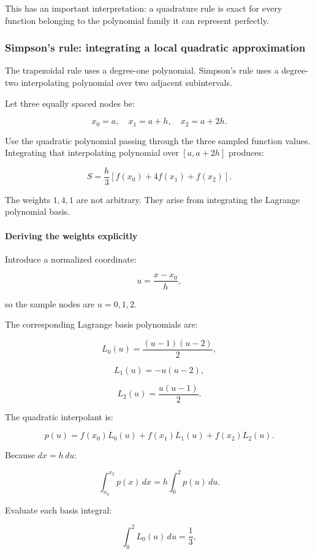 This has an important interpretation: a quadrature rule is exact for every function belonging to the polynomial family it can represent perfectly.

\subsubsection{Simpson's rule: integrating a local quadratic approximation}\label{02-foundations-ii-ch022-simpsons-rule-integrating-a-local-quadratic-approximation}

The trapezoidal rule uses a degree-one polynomial. Simpson's rule uses a degree-two interpolating polynomial over two adjacent subintervals.

Let three equally spaced nodes be:

\[
x_0=a,\quad x_1=a+h,\quad x_2=a+2h.
\]

Use the quadratic polynomial passing through the three sampled function values. Integrating that interpolating polynomial over \([a,a+2h]\) produces:

\[
\boxed{ S=\frac h3[f(x_0)+4f(x_1)+f(x_2)] }.
\]

The weights \(1,4,1\) are not arbitrary. They arise from integrating the Lagrange polynomial basis.

\paragraph{Deriving the weights explicitly}\label{02-foundations-ii-ch022-deriving-the-weights-explicitly}

Introduce a normalized coordinate:

\[
u=\frac{x-x_0}{h},
\]

so the sample nodes are \(u=0,1,2\).

The corresponding Lagrange basis polynomials are:

\[
L_0(u)=\frac{(u-1)(u-2)}2,
\]

\[
L_1(u)=-u(u-2),
\]

\[
L_2(u)=\frac{u(u-1)}2.
\]

The quadratic interpolant is:

\[
p(u)=f(x_0)L_0(u)+f(x_1)L_1(u)+f(x_2)L_2(u).
\]

Because \(dx=h\,du\):

\[
\int_{x_0}^{x_2}p(x)\,dx = h\int_0^2p(u)\,du.
\]

Evaluate each basis integral:

\[
\int_0^2L_0(u)\,du=\frac13,
\]

